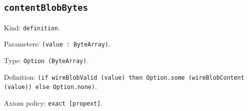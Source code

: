 \documentclass[11pt]{article}
\begin{document}
\subsection*{\texttt{contentBlobBytes}}
\noindent Kind: \texttt{definition}.\par
\noindent Parameters: \texttt{(value : ByteArray)}.\par
\noindent Type: \texttt{Option (ByteArray)}.\par
\noindent Definition: \texttt{(if wireBlobValid (value) then Option.some (wireBlobContent (value)) else Option.none)}.\par
\noindent Axiom policy: \texttt{exact [propext]}.\par
\end{document}
